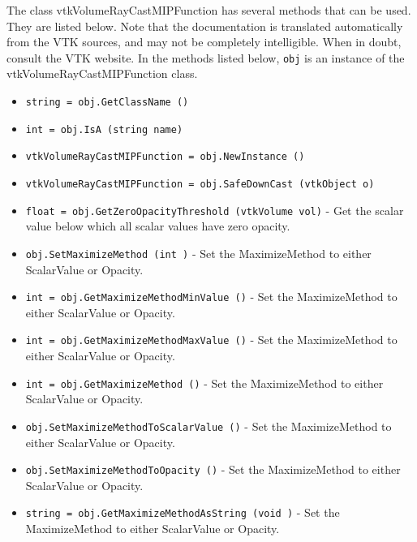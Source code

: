 The class vtkVolumeRayCastMIPFunction has several methods that can be used.
  They are listed below.
Note that the documentation is translated automatically from the VTK sources,
and may not be completely intelligible.  When in doubt, consult the VTK website.
In the methods listed below, \verb|obj| is an instance of the vtkVolumeRayCastMIPFunction class.
\begin{itemize}
\item  \verb|string = obj.GetClassName ()|

\item  \verb|int = obj.IsA (string name)|

\item  \verb|vtkVolumeRayCastMIPFunction = obj.NewInstance ()|

\item  \verb|vtkVolumeRayCastMIPFunction = obj.SafeDownCast (vtkObject o)|

\item  \verb|float = obj.GetZeroOpacityThreshold (vtkVolume vol)| -  Get the scalar value below which all scalar values have zero opacity.

\item  \verb|obj.SetMaximizeMethod (int )| -  Set the MaximizeMethod to either ScalarValue or Opacity.

\item  \verb|int = obj.GetMaximizeMethodMinValue ()| -  Set the MaximizeMethod to either ScalarValue or Opacity.

\item  \verb|int = obj.GetMaximizeMethodMaxValue ()| -  Set the MaximizeMethod to either ScalarValue or Opacity.

\item  \verb|int = obj.GetMaximizeMethod ()| -  Set the MaximizeMethod to either ScalarValue or Opacity.

\item  \verb|obj.SetMaximizeMethodToScalarValue ()| -  Set the MaximizeMethod to either ScalarValue or Opacity.

\item  \verb|obj.SetMaximizeMethodToOpacity ()| -  Set the MaximizeMethod to either ScalarValue or Opacity.

\item  \verb|string = obj.GetMaximizeMethodAsString (void )| -  Set the MaximizeMethod to either ScalarValue or Opacity.

\end{itemize}
